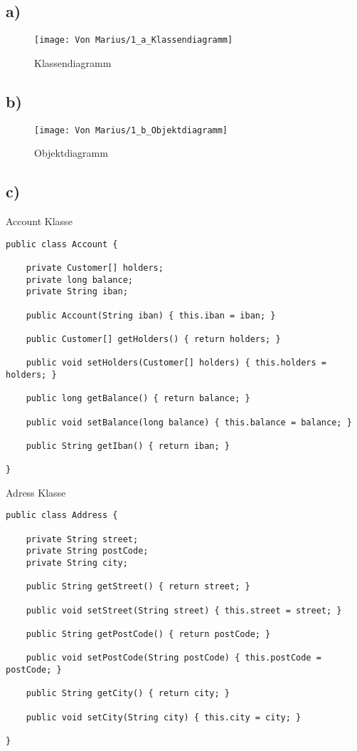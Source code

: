 \documentclass[12pt,a4paper,oneside,ngerman]{article}
\begin{document}
\subsection*{a)}
\begin{figure}[ht]
	\centering
  \texttt{[image: Von Marius/1\_a\_Klassendiagramm]}
	\caption{Klassendiagramm}
\end{figure}
\subsection*{b)}
\begin{figure}[ht]
	\centering
  \texttt{[image: Von Marius/1\_b\_Objektdiagramm]}
	\caption{Objektdiagramm}
\end{figure}

\subsection*{c)}

Account Klasse
\begin{lstlisting}
public class Account {
	
	private Customer[] holders;
	private long balance;
	private String iban;
	
	public Account(String iban) { this.iban = iban; }

	public Customer[] getHolders() { return holders; }

	public void setHolders(Customer[] holders) { this.holders = holders; }

	public long getBalance() { return balance; }

	public void setBalance(long balance) { this.balance = balance; }

	public String getIban() { return iban; }

}

\end{lstlisting}

Adress Klasse
\begin{lstlisting}
public class Address {
	
	private String street;
	private String postCode;
	private String city;

	public String getStreet() { return street; }
	
	public void setStreet(String street) { this.street = street; }
	
	public String getPostCode() { return postCode; }
	
	public void setPostCode(String postCode) { this.postCode = postCode; }
	
	public String getCity() { return city; }
	
	public void setCity(String city) { this.city = city; }

}
\end{lstlisting}
\end{document}
